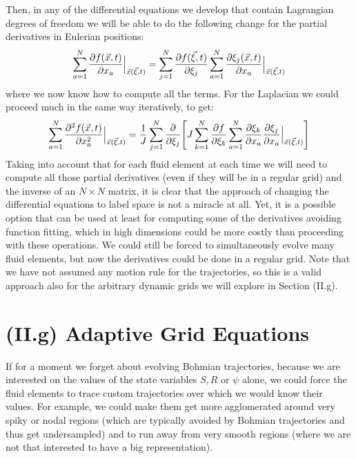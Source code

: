 \documentclass[11pt, a4paper]{article} %
\begin{document}
Then, in any of the differential equations we develop that contain Lagrangian degrees of freedom we will be able to do the following change for the partial derivatives in Eulerian positions:
\begin{equation}
\sum_{a=1}^N \pdv{f(\vec{x},t)}{x_a}\Big\rvert_{\vec{x}(\vec{\xi},t)} = \sum_{j=1}^N \pdv{f(\vec{\xi},t)}{\xi_j} \sum_{a=1}^N \pdv{\xi_j(\vec{x},t)}{x_a}\Big\rvert_{\vec{x}(\vec{\xi},t)}
\end{equation}
where we now know how to compute all the terms. For the Laplacian we could proceed much in the same way iteratively, to get:
\begin{equation}
\sum_{a=1}^N \pdv[2]{f(\vec{x},t)}{x_a}\Big\rvert_{\vec{x}(\vec{\xi},t)}=\frac{1}{J} \sum_{j=1}^N\pdv{}{\xi_j} \qty[ J\sum_{k=1}^N\pdv{f}{\xi_k}\sum_{a=1}^N\pdv{\xi_k}{x_a}\pdv{\xi_j}{x_a}\Big\rvert_{\vec{x}(\vec{\xi},t)}]
\end{equation}
Taking into account that for each fluid element at each time we will need to compute all those partial derivatives (even if they will be in a regular grid) and the inverse of an $N\times N$ matrix, it is clear that the approach of changing the differential equations to label space is not a miracle at all. Yet, it is a possible option that can be used at least for computing some of the derivatives avoiding function fitting, which in high dimensions could be more costly than proceeding with these operations. We could still be forced to simultaneously evolve many fluid elements, but now the derivatives could be done in a regular grid. Note that we have not assumed any motion rule for the trajectories, so this is a valid approach also for the arbitrary dynamic grids we will explore in Section (II.g).


\section*{(II.g) Adaptive Grid Equations\vspace{-0.2cm}}

If for a moment we forget about evolving Bohmian trajectories, because we are interested on the values of the state variables $S,R$ or $\psi$ alone, we could force the fluid elements to trace custom trajectories over which we would know their values. For example, we could make them get more agglomerated around very spiky or nodal regions (which are typically avoided by Bohmian trajectories and thus get undersampled) and to run away from very smooth regions (where we are not that interested to have a big representation).
\end{document}
